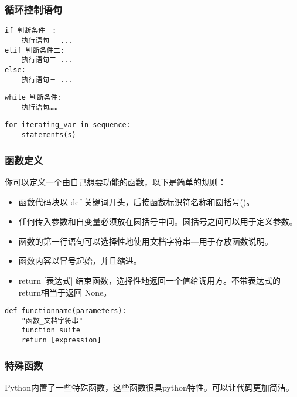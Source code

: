 \subsubsection{循环控制语句}

\begin{verbatim}
if 判断条件一:
    执行语句一 ...
elif 判断条件二:
    执行语句二 ...
else:
    执行语句三 ...
\end{verbatim}

\begin{verbatim}
while 判断条件:
    执行语句……
\end{verbatim}

\begin{verbatim}
for iterating_var in sequence:
    statements(s)
\end{verbatim}

\subsubsection{函数定义}
你可以定义一个由自己想要功能的函数，以下是简单的规则：
\begin{itemize}
\item 函数代码块以 def 关键词开头，后接函数标识符名称和圆括号()。
\item 任何传入参数和自变量必须放在圆括号中间。圆括号之间可以用于定义参数。
\item 函数的第一行语句可以选择性地使用文档字符串—用于存放函数说明。
\item 函数内容以冒号起始，并且缩进。
\item return [表达式] 结束函数，选择性地返回一个值给调用方。不带表达式的return相当于返回 None。
\end{itemize}

\begin{verbatim}
def functionname(parameters):
    "函数_文档字符串"
    function_suite
    return [expression]
\end{verbatim}

\subsubsection{特殊函数}
Python内置了一些特殊函数，这些函数很具python特性。可以让代码更加简洁。

